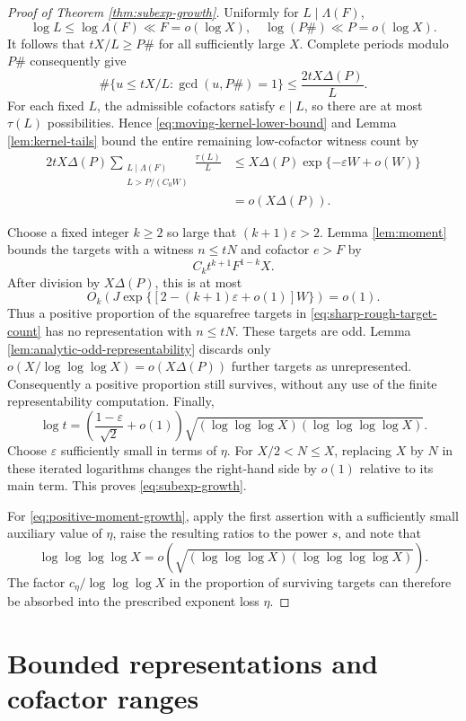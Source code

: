 \documentclass[11pt,letterpaper,reqno]{amsart}
\numberwithin{equation}{section}
\theoremstyle{remark}
\newcommand{\1}{\mathbf 1}
\renewcommand{\leq}{\leqslant}
\renewcommand{\geq}{\geqslant}
\begin{document}
\begin{proof}[Proof of Theorem \ref{thm:subexp-growth}]
Uniformly for $L\mid \Lambda(F)$,
\[
 \log L\leq\log \Lambda(F)\ll F=o(\log X),
 \quad \log(P\#)\ll P=o(\log X).
\]
It follows that $tX/L\geq P\#$ for all sufficiently large $X$. Complete
periods modulo $P\#$ consequently give
\[
 \#\{u\leq tX/L:\gcd(u,P\#)=1\}
 \leq\frac{2tX\Delta(P)}{L}.
\]
For each fixed $L$, the admissible cofactors satisfy $e\mid L$, so there are
at most $\tau(L)$ possibilities. Hence \eqref{eq:moving-kernel-lower-bound}
and Lemma \ref{lem:kernel-tails} bound the entire remaining low-cofactor
witness count by
\begin{align*}
 2tX\Delta(P)
 \sum_{\substack{L\mid \Lambda(F)\\L>P/(C_0W)}}\frac{\tau(L)}L
 &\leq X\Delta(P)\exp\{-\varepsilon W+o(W)\}\\
 &=o(X\Delta(P)).
\end{align*}

Choose a fixed integer $k\geq2$ so large that $(k+1)\varepsilon>2$.
Lemma \ref{lem:moment} bounds the targets with a witness $n\leq tN$ and
cofactor $e>F$ by
\[
 C_kt^{k+1}F^{1-k}X.
\]
After division by $X\Delta(P)$, this is at most
\[
 O_k\left(J\exp\{[2-(k+1)\varepsilon+o(1)]W\}\right)=o(1).
\]
Thus a positive proportion of the squarefree targets in
\eqref{eq:sharp-rough-target-count} has no representation with $n\leq tN$.
These targets are odd. Lemma \ref{lem:analytic-odd-representability}
discards only $o(X/\log\log\log X)=o(X\Delta(P))$ further targets as unrepresented.
Consequently a positive proportion still survives, without any use of the
finite representability computation. Finally,
\[
 \log t
 =\left(\frac{1-\varepsilon}{\sqrt2}+o(1)\right)
 \sqrt{(\log\log\log X)(\log\log\log\log X)}.
\]
Choose $\varepsilon$ sufficiently small in terms of $\eta$. For
$X/2<N\leq X$, replacing $X$ by $N$ in these iterated logarithms changes
the right-hand side by $o(1)$ relative to its main term. This proves
\eqref{eq:subexp-growth}.

For \eqref{eq:positive-moment-growth}, apply the first assertion with a
sufficiently small auxiliary value of $\eta$, raise the resulting ratios to
the power $s$, and note that
\[
 \log\log\log\log X
 =o\left(\sqrt{(\log\log\log X)(\log\log\log\log X)}\right).
\]
The factor $c_\eta/\log\log\log X$ in the proportion of surviving targets can
therefore be absorbed into the prescribed exponent loss $\eta$.
\end{proof}


\section{Bounded representations and cofactor ranges}\label{sec:tightness}
\end{document}
